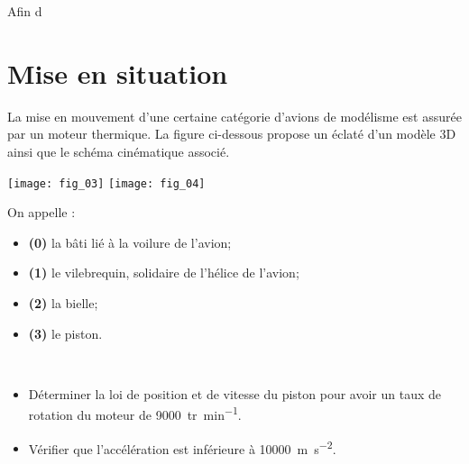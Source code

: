 \ifprof
\else
\begin{multicols}{2}
\fi


Afin d\section*{Mise en situation}
La mise en mouvement d'une certaine catégorie d'avions de modélisme est assurée par un moteur thermique.   La figure ci-dessous propose un éclaté d'un modèle 3D ainsi que le schéma cinématique associé. 

\begin{center}
\texttt{[image: fig\_03]}
\texttt{[image: fig\_04]}
\end{center}

On appelle : 
\begin{itemize}
\item \textbf{(0)} la bâti lié à la voilure de l'avion;
\item \textbf{(1)} le vilebrequin, solidaire de l'hélice de l'avion;
\item \textbf{(2)} la bielle;
\item \textbf{(3)} le piston.
\end{itemize}

\begin{obj} ~\\
\begin{itemize}
\item Déterminer la loi de position et de vitesse du piston pour avoir un taux de rotation du moteur de \SI{9000}{tr.min^{-1}}.
\item Vérifier que l'accélération est inférieure à \SI{10000}{m.s^{-2}}.
\end{itemize}
\end{obj}



\end{multicols}

